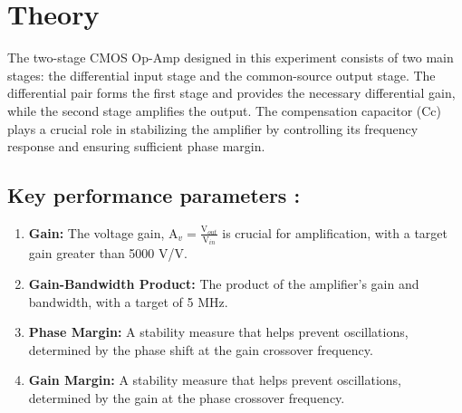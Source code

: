 \documentclass[11pt]{article}
\begin{document}
\section{Theory}
The two-stage CMOS Op-Amp designed in this experiment consists of two main stages: the differential input stage and the common-source output stage. The differential pair forms the first stage and provides the necessary differential gain, while the second stage amplifies the output. The compensation capacitor (Cc) plays a crucial role in stabilizing the amplifier by controlling its frequency response and ensuring sufficient phase margin.

\subsection*{Key performance parameters :}
\begin{enumerate}
    \item \textbf{Gain:} The voltage gain, $\text{A}_{v}=\frac{\text{V}_{out}}{\text{V}_{in}}$ is crucial for amplification, with a target gain greater than 5000 V/V.
    \item \textbf{Gain-Bandwidth Product:} The product of the amplifier's gain and bandwidth, with a target of 5 MHz.
    \item \textbf{Phase Margin:}  A stability measure that helps prevent oscillations, determined by the phase shift at the gain crossover frequency.
    \item \textbf{Gain Margin:} A stability measure that helps prevent oscillations, determined by the gain at the phase crossover frequency.
\end{enumerate}
\newpage
\end{document}
